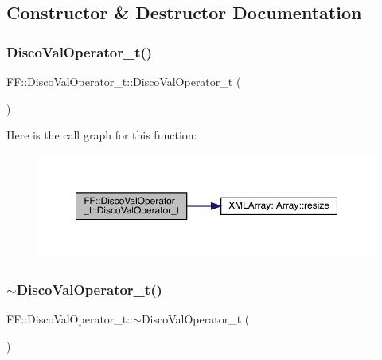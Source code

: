 \subsection{Constructor \& Destructor Documentation}
\mbox{\label{classFF_1_1DiscoValOperator__t_a818e9637a1ac97359f1e611f1f524761}} 
\subsubsection{\texorpdfstring{DiscoValOperator\_t()}{DiscoValOperator\_t()}\hspace{0.1cm}{\footnotesize\ttfamily [1/2]}}
{\footnotesize\ttfamily F\+F\+::\+Disco\+Val\+Operator\+\_\+t\+::\+Disco\+Val\+Operator\+\_\+t (\begin{DoxyParamCaption}{ }\end{DoxyParamCaption})\hspace{0.3cm}{\ttfamily [inline]}}

Here is the call graph for this function\+:\nopagebreak
\begin{figure}[H]
\begin{center}
\leavevmode
\includegraphics[width=350pt]{d2/dbc/classFF_1_1DiscoValOperator__t_a818e9637a1ac97359f1e611f1f524761_cgraph}
\end{center}
\end{figure}
\mbox{\label{classFF_1_1DiscoValOperator__t_aff2684b99129c3fa09b915d69abeb421}} 
\subsubsection{\texorpdfstring{$\sim$DiscoValOperator\_t()}{~DiscoValOperator\_t()}\hspace{0.1cm}{\footnotesize\ttfamily [1/2]}}
{\footnotesize\ttfamily F\+F\+::\+Disco\+Val\+Operator\+\_\+t\+::$\sim$\+Disco\+Val\+Operator\+\_\+t (\begin{DoxyParamCaption}{ }\end{DoxyParamCaption})\hspace{0.3cm}{\ttfamily [inline]}}


